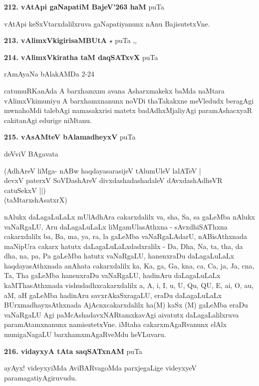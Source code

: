 \medskip
\noindent\textbf{212. vAtApi gaNapatiM BajeV\char'263 haM} \hfill puTa \pageref{45}

\hfill vAtApi keSxVtarxdalilxruva gaNapatiyanunx nAnu BajisutetxVne.

\medskip
\noindent\textbf{213. vAlimxVkigirisaMBUtA} $\star$ \hfill puTa \pageref{151a},\pageref{166b},\pageref{174}

\medskip
\noindent\textbf{214. vAlimxVkiratha taM daqSATxvX} \hfill puTa \pageref{202a}

\hfill rAmAyaNa bAlakAMDa 2-24

catumuRKanAda A barxhamxnu avana Asharxmakekx baMda naMtara vAlimxVkimuniyu A barxhamxnanunx noVDi thaTakakxne meVledudx beragAgi mwnahoMdi  talebAgi namasakxrisi matetx badAdhxMjaliyAgi paramAshacxyaR cakitanAgi edurige niMtanu.

\medskip
\noindent\textbf{215. vAsAMteV bAlamadheyxV} \hfill puTa \pageref{29}

\hfill deVviV BAgavata

\begin{shloka}
(AdhAreV liMga- nABw haqdayasarasijeV tAlumUleV lalATeV |\\
devxV paterxV SoVDashAreV divxdashadashadaleV dAvxdashAdheVR catuSekxV ||)\\
\hfill (taMtarxshAsatxrX)
\end{shloka}

nAlukx daLagaLuLaLx mUlAdhAra cakarxdalilx va, sha, Sa, sa gaLeMba nAlukx vaNaRgaLU,  Aru daLagaLuLaLx liMgamUlasAthxna - sAvxdhiSAThxna cakarxdalilx ba, Ba, ma, ya, ra, la gaLeMba vaNaRgaLAdarU, nABisAthxnada maNipUra cakarx hatutx daLagaLuLaLxdadxralilx - Da, Dha, Na, ta, tha, da dha, na, pa, Pa gaLeMba hatutx vaNaRgaLU, hanenxraDu daLagaLuLaLx haqdayasAthxnada anAhata cakarxdalilx ka, Ka, ga, Ga, kna, ca, Ca, ja, Ja, cna, Ta, Tha gaLeMba hanenxraDu vaNaRgaLU, hadinAru daLagaLuLaLx kaMThasAthxnada vishudadhxcakarxdalilx a, A, i, I, u, U, Qu, QU, E, ai, O, au, aM, aH gaLeMba hadinAru savxrAkaSxragaLU, eraDu daLagaLuLaLx BUrxmadhayxsAthxnada AjAcnxcakarxdalilx ha(M) kaSx (M) gaLeMba eraDu vaNaRgaLU Agi paMcAshadavxNARtamxkavAgi aivatutx daLagaLalilxruva paramAtamxnanunx namisutetxVne. iMtaha cakarxmAgaRvanunx elAlx munigaNagaLU barxhamxmAgaRveMdu heVLuvaru.

\medskip
\noindent\textbf{216. vidayxyA tAta saqSATxnAM} \hfill puTa \pageref{133}

ayAyx! videyxyiMda AviBARvagoMda parxjegaLige videyxyeV paramagatiyAgiruvudu.

